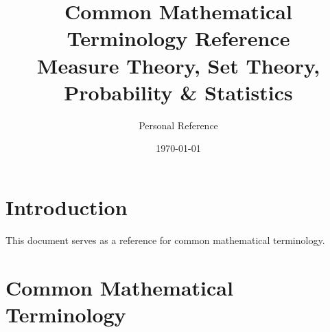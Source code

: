 \documentclass[a4paper,10pt]{article}
\title{\textbf{Common Mathematical Terminology Reference}\\\large Measure Theory, Set Theory, Probability \& Statistics}
\author{Personal Reference}
\date{\today}
\begin{document}
\maketitle

\section{Introduction}
This document serves as a reference for common mathematical terminology.

\setlength{\tabcolsep}{10pt} %
\renewcommand{\arraystretch}{1.5} %

\section{Common Mathematical Terminology}

\end{document}
